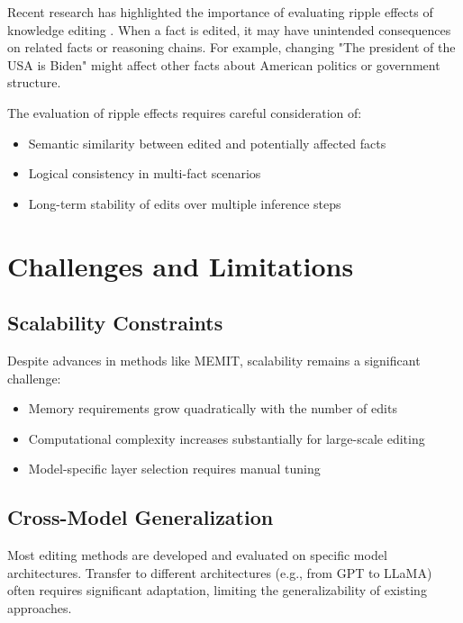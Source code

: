 Recent research has highlighted the importance of evaluating ripple effects of knowledge editing \cite{wang_2023_ripple_effects}. When a fact is edited, it may have unintended consequences on related facts or reasoning chains. For example, changing "The president of the USA is Biden" might affect other facts about American politics or government structure.

The evaluation of ripple effects requires careful consideration of:
\begin{itemize}
    \item Semantic similarity between edited and potentially affected facts
    \item Logical consistency in multi-fact scenarios
    \item Long-term stability of edits over multiple inference steps
\end{itemize}


\section{Challenges and Limitations}

\subsection{Scalability Constraints}

Despite advances in methods like MEMIT, scalability remains a significant challenge:
\begin{itemize}
    \item Memory requirements grow quadratically with the number of edits
    \item Computational complexity increases substantially for large-scale editing
    \item Model-specific layer selection requires manual tuning
\end{itemize}

\subsection{Cross-Model Generalization}

Most editing methods are developed and evaluated on specific model architectures. Transfer to different architectures (e.g., from GPT to LLaMA) often requires significant adaptation, limiting the generalizability of existing approaches.

